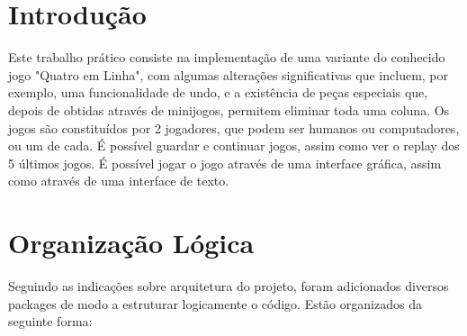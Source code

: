 \documentclass[11pt]{article}
\begin{document}
	
	
	\tableofcontents
	\pagebreak
	
	\large
	\section{Introdução}
	
	\normalsize
	Este trabalho prático consiste na implementação de uma variante do conhecido jogo "Quatro em Linha", com algumas alterações significativas que incluem, por exemplo, uma funcionalidade de undo, e a existência de peças especiais que, depois de obtidas através de minijogos, permitem eliminar toda uma coluna. Os jogos são constituídos por 2 jogadores, que podem ser humanos ou computadores, ou um de cada. É possível guardar e continuar jogos, assim como ver o replay dos 5 últimos jogos. É possível jogar o jogo através de uma interface gráfica, assim como através de uma interface de texto.
	
	\large
	\section{Organização Lógica}
	\normalsize
	
	Seguindo as indicações sobre arquitetura do projeto, foram adicionados diversos packages de modo a estruturar logicamente o código. Estão organizados da seguinte forma:
	
\end{document}

